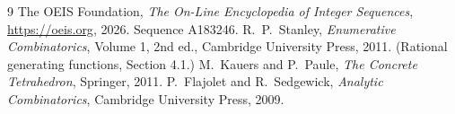\documentclass[11pt,a4paper]{article}
\theoremstyle{plain}
\theoremstyle{definition}
\begin{document}
\begin{thebibliography}{9}
 The OEIS Foundation, \emph{The On-Line Encyclopedia of Integer
Sequences}, \url{https://oeis.org}, 2026. Sequence A183246.
 R.~P.~Stanley, \emph{Enumerative Combinatorics}, Volume 1, 2nd ed.,
Cambridge University Press, 2011. (Rational generating functions, Section 4.1.)
 M.~Kauers and P.~Paule, \emph{The Concrete Tetrahedron}, Springer, 2011.
 P.~Flajolet and R.~Sedgewick, \emph{Analytic Combinatorics}, Cambridge
University Press, 2009.
\end{thebibliography}
\end{document}
